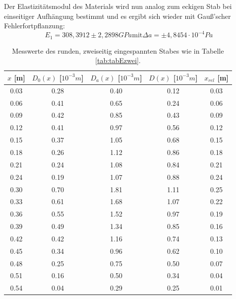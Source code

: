\documentclass[titlepage = firstcover]{scrartcl}
\begin{document}
      Der Elastizitätsmodul des Materials wird nun analog zum eckigen Stab bei einseitiger Aufhängung bestimmt und es ergibt sich wieder mit Gauß'scher Fehlerfortpflanzung:
      \begin{equation*}
        E_1 = 308,3912 \pm 2,2898 GPa \text{mit} \Delta a = \pm 4,8454 \cdot 10^{-4} Pa
      \end{equation*}

      \begin{table}[h]
        \centering
        \caption{Messwerte des runden, zweiseitig eingespannten Stabes wie in Tabelle \ref{tab:tabEzwei}.}
        \label{tab:tabRzwei}
        \begin{tabular}{c c c c c}
          \toprule
          {$x$ [m]} & {$D_0(x)$ [$10^{-3}m$]} & {$D_a(x)$ [$10^{-3}m$]} & {$D(x)$ [$10^{-3}m$]} & {$x_{rel}$ [m]}\\
          \midrule
          0.03 & 0.28 & 0.40 & 0.12 & 0.03\\
          0.06 & 0.41 & 0.65 & 0.24 & 0.06\\
          0.09 & 0.42 & 0.85 & 0.43 & 0.09\\
          0.12 & 0.41 & 0.97 & 0.56 & 0.12\\
          0.15 & 0.37 & 1.05 & 0.68 & 0.15\\
          0.18 & 0.26 & 1.12 & 0.86 & 0.18\\
          0.21 & 0.24 & 1.08 & 0.84 & 0.21\\
          0.24 & 0.19 & 1.07 & 0.88 & 0.24\\
          0.30 & 0.70 & 1.81 & 1.11 & 0.25\\
          0.33 & 0.61 & 1.68 & 1.07 & 0.22\\
          0.36 & 0.55 & 1.52 & 0.97 & 0.19\\
          0.39 & 0.49 & 1.34 & 0.85 & 0.16\\
          0.42 & 0.42 & 1.16 & 0.74 & 0.13\\
          0.45 & 0.34 & 0.96 & 0.62 & 0.10\\
          0.48 & 0.25 & 0.75 & 0.50 & 0.07\\
          0.51 & 0.16 & 0.50 & 0.34 & 0.04\\
          0.54 & 0.04 & 0.29 & 0.25 & 0.01\\
          \bottomrule            
        \end{tabular}
      \end{table}
\end{document}

